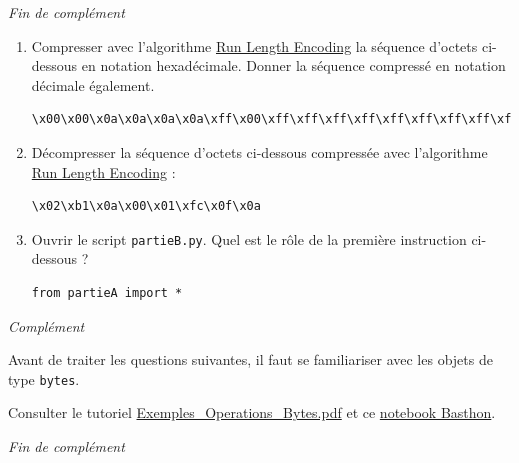 \documentclass[a4paper, french, 12pt]{article}  %
\newcounter{thme}
\newcounter{alg}
\begin{document}
\begin{center}
\hfill \hrulefill \textit{Fin de complément} \hrulefill \hfill  \null
\end{center}


\begin{enumerate}
	\item Compresser avec l'algorithme \href{https://fr.wikipedia.org/wiki/Run-length_encoding}{Run Length Encoding} la séquence d'octets ci-dessous en notation hexadécimale. Donner la séquence compressé en notation décimale également.

\begin{center}
\begin{verbatim}
\x00\x00\x0a\x0a\x0a\x0a\xff\x00\xff\xff\xff\xff\xff\xff\xff\xff\xff\xff\xff
\end{verbatim}
\end{center}

	\item Décompresser la séquence d'octets ci-dessous compressée avec l'algorithme \href{https://fr.wikipedia.org/wiki/Run-length_encoding}{Run Length Encoding} :

\begin{center}
\begin{verbatim}
\x02\xb1\x0a\x00\x01\xfc\x0f\x0a
\end{verbatim}
\end{center}

\item Ouvrir le script \texttt{partieB.py}. Quel est le rôle de la première instruction ci-dessous ?

\begin{lstlisting}[style=rond]
from partieA import *
\end{lstlisting}

\end{enumerate}

\begin{center}
\hfill \hrulefill \textit{Complément} \hrulefill \hfill  \null
\end{center}
{\itshape

Avant de traiter les questions suivantes, il faut se familiariser avec les objets de type \texttt{bytes}. 

Consulter le tutoriel  \href{Exemples\_Operations\_Bytes.pdf}{Exemples\_Operations\_Bytes.pdf}  et ce \href{https://frama.link/ExemplesOperationsBytes2}{notebook Basthon}.
}

\begin{center}
\hfill \hrulefill \textit{Fin de complément} \hrulefill \hfill  \null
\end{center}
\end{document}
